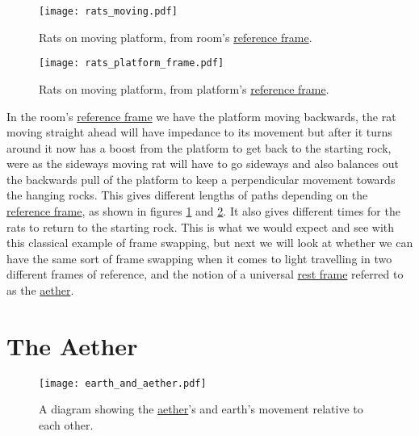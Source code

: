 \begin{paracol}{2}
\begin{figure}[H]
\centering
    \texttt{[image: rats\_moving.pdf]}
    \caption{Rats on moving platform, from room's \protect\hyperlink{def-Reference-frame}{reference frame}.}
    \label{fig: rat with moving platform}
\end{figure}
\switchcolumn
\begin{figure}[H]
\centering
       \texttt{[image: rats\_platform\_frame.pdf]}
    \caption{Rats on moving platform, from platform's \protect\hyperlink{def-Reference-frame}{reference frame}.}
    \label{fig: rat platform reference frame}
\end{figure}
\end{paracol}

\iffalse javascript{Rats_treadmill} \fi

In the room's \hyperlink{def-Reference-frame}{reference frame} we have the platform moving backwards, the rat moving straight ahead will have impedance to its movement but after it turns around it now has a boost from the platform to get back to the starting rock, were as the sideways moving rat will have to go sideways and also balances out the backwards pull of the platform to keep a perpendicular movement towards the hanging rocks. This gives different lengths of paths depending on the \hyperlink{def-Reference-frame}{reference frame}, as shown in figures \ref{fig: rat with moving platform} and \ref{fig: rat platform reference frame}. It also gives different times for the rats to return to the starting rock. This is what we would expect and see with this classical example of frame swapping, but next we will look at whether we can have the same sort of frame swapping when it comes to light travelling in two different frames of reference, and the notion of a universal \hyperlink{def-proper-frame}{rest frame} referred to as the \hyperlink{def-aether}{aether}.

\section{The Aether}%


\begin{figure}[ht]
\centering
       \texttt{[image: earth\_and\_aether.pdf]}
    \caption{A diagram showing the \protect\hyperlink{def-aether}{aether}'s and earth's movement relative to each other.}
    \label{fig: Aether}
\end{figure}

